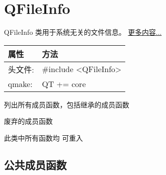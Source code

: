 \chapter{QFileInfo}

QFileInfo 类用于系统无关的文件信息。
\href{https://github.com/JackLovel/QtDocumentCN/blob/master/Src/F/QFileInfo/QFileInfo.md#%E8%AF%A6%E7%BB%86%E6%8F%8F%E8%BF%B0}{
  更多内容...} 

\begin{tabular}{|l|l|}
\hline
属性 &	方法\\
\hline
头文件:& 	\#include <QFileInfo>\\
\hline
qmake:& 	QT += core\\
\hline
\end{tabular}

\begin{compactitem}
\item 列出所有成员函数，包括继承的成员函数
\item 废弃的成员函数
\end{compactitem}

\begin{notice}
	此类中所有函数均 可重入
\end{notice}


\splitLine

\section{公共成员函数}

